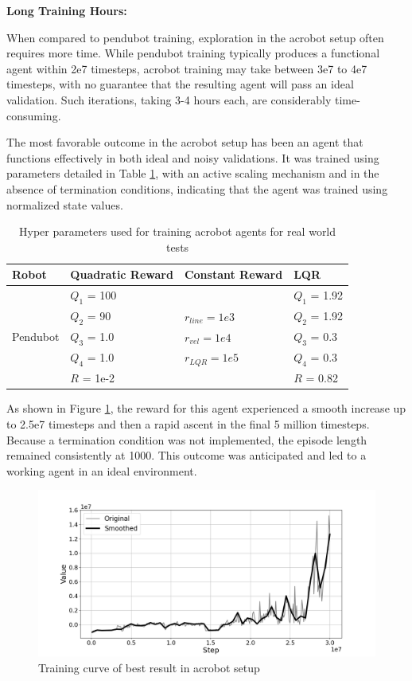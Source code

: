 \textbf{Long Training Hours:}

When compared to pendubot training, exploration in the acrobot setup often requires more time. While pendubot training typically produces a functional agent within 2e7 timesteps, acrobot training may take between 3e7 to 4e7 timesteps, with no guarantee that the resulting agent will pass an ideal validation. Such iterations, taking 3-4 hours each, are considerably time-consuming.

The most favorable outcome in the acrobot setup has been an agent that functions effectively in both ideal and noisy validations. It was trained using parameters detailed in Table \ref{tab:training_parameters_real_world_acrobot}, with an active scaling mechanism and in the absence of termination conditions, indicating that the agent was trained using normalized state values.

\begin{table}[H]
  \centering
  \begin{tabular}{p{2cm} | p{3cm} | p{3cm} | p{3cm}}
  Robot & Quadratic Reward  & Constant Reward & LQR\\
  \hline
  \multirow{5}{*}{Pendubot} & \(Q_1\) = 100 &  & \(Q_1\) = 1.92\\
  & \(Q_2\) = 90  & \(r_{line}=1e3\) & \(Q_2\) = 1.92\\
  & \(Q_3\) = 1.0  & \(r_{vel}=1e4\) & \(Q_3\) = 0.3\\
  & \(Q_4\) = 1.0  & \(r_{LQR}=1e5\)& \(Q_4\) = 0.3\\
  & \(R\) = 1e-2  & & \(R\) = 0.82\\
  \end{tabular}
 \caption{Hyper parameters used for training acrobot agents for real world tests}
 \label{tab:training_parameters_real_world_acrobot}
\end{table}

As shown in Figure \ref{fig:acrobot_training_curve}, the reward for this agent experienced a smooth increase up to 2.5e7 timesteps and then a rapid ascent in the final 5 million timesteps. Because a termination condition was not implemented, the episode length remained consistently at 1000. This outcome was anticipated and led to  a working agent in an ideal environment.

\begin{figure}[H]
    \centering
    \includegraphics[width=1.1\linewidth]{figures/hardware_result/acrobot_learning_curve_real_world.png}
    \caption{Training curve of best result in acrobot setup}
    \label{fig:acrobot_training_curve}
\end{figure}


